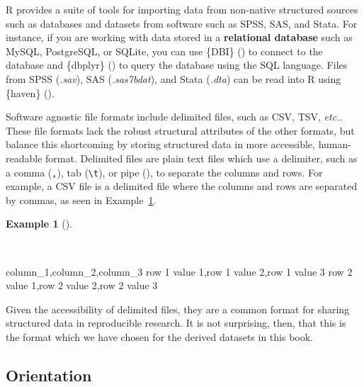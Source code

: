 \documentclass[
  letterpaper,
  krantz1]{latex/krantz-mod}
\newenvironment{Shaded}{\begin{snugshade}}{\end{snugshade}}
\newcommand{\NormalTok}[1]{\textcolor[rgb]{0.00,0.00,0.00}{#1}}
\theoremstyle{definition}
\newtheorem{example}{Example}[chapter]
\theoremstyle{definition}
\theoremstyle{remark}
\begin{document}
R provides a suite of tools for importing data from non-native
structured sources such as databases and datasets from software such as
SPSS, SAS, and Stata. For instance, if you are working with data stored
in a \textbf{relational database} such as MySQL, PostgreSQL, or SQLite,
you can use \{DBI\} () to connect to the
database and \{dbplyr\} () to query the database using the SQL language. Files from
SPSS (\emph{.sav}), SAS (\emph{.sas7bdat}), and Stata (\emph{.dta}) can
be read into R using \{haven\} ().

Software agnostic file formats include delimited files, such as CSV,
TSV, \emph{etc.}. These file formats lack the robust structural
attributes of the other formats, but balance this shortcoming by storing
structured data in more accessible, human-readable format. Delimited
files are plain text files which use a delimiter, such as a comma
(\texttt{,}), tab (\texttt{\textbackslash{}t}), or pipe
(\texttt{\textbar{}}), to separate the columns and rows. For example, a
CSV file is a delimited file where the columns and rows are separated by
commas, as seen in Example~\ref{exm-curate-csv-example}.

\begin{example}[]\protect\hypertarget{exm-curate-csv-example}{}\label{exm-curate-csv-example}

~

\begin{Shaded}
\begin{Highlighting}[numbers=left,,]
\NormalTok{column\_1,column\_2,column\_3}
\NormalTok{row 1 value 1,row 1 value 2,row 1 value 3}
\NormalTok{row 2 value 1,row 2 value 2,row 2 value 3}
\end{Highlighting}
\end{Shaded}

\end{example}

Given the accessibility of delimited files, they are a common format for
sharing structured data in reproducible research. It is not surprising,
then, that this is the format which we have chosen for the derived
datasets in this book.

\subsection{Orientation}\label{orientation-1}
\end{document}
